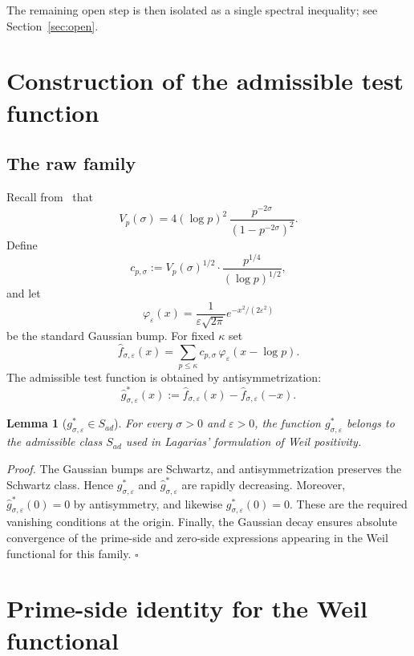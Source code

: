 \documentclass[11pt]{article}
\newtheorem*{lemma*}{Lemma}
\begin{document}
The remaining open step is then isolated as a single spectral inequality;
see Section~\ref{sec:open}.

\section{Construction of the admissible test function}

\subsection{The raw family}

Recall from~\cite[Eq.~(3)]{paper1} that
\[
V_p(\sigma)
= 4(\log p)^2\,\frac{p^{-2\sigma}}{(1-p^{-2\sigma})^2}.
\]
Define
\[
c_{p,\sigma}
:= V_p(\sigma)^{1/2}
\cdot \frac{p^{1/4}}{(\log p)^{1/2}},
\]
and let
\[
\varphi_\varepsilon(x)
= \frac{1}{\varepsilon\sqrt{2\pi}}e^{-x^2/(2\varepsilon^2)}
\]
be the standard Gaussian bump. For fixed $\kappa$ set
\[
\widehat f_{\sigma,\varepsilon}(x)
= \sum_{p\le\kappa} c_{p,\sigma}\,\varphi_\varepsilon(x-\log p).
\]
The admissible test function is obtained by antisymmetrization:
\begin{equation}\label{eq:gstar}
\widehat g^*_{\sigma,\varepsilon}(x)
:= \widehat f_{\sigma,\varepsilon}(x)
- \widehat f_{\sigma,\varepsilon}(-x).
\end{equation}

\begin{lemma*}[$g^*_{\sigma,\varepsilon} \in S_{ad}$]
For every $\sigma>0$ and $\varepsilon>0$, the function
$g^*_{\sigma,\varepsilon}$ belongs to the admissible class $S_{ad}$ used in
Lagarias' formulation of Weil positivity.
\end{lemma*}

\textit{Proof.}
The Gaussian bumps are Schwartz, and antisymmetrization preserves the
Schwartz class. Hence $g^*_{\sigma,\varepsilon}$ and
$\widehat g^*_{\sigma,\varepsilon}$ are rapidly decreasing. Moreover,
$\widehat g^*_{\sigma,\varepsilon}(0)=0$ by antisymmetry, and likewise
$g^*_{\sigma,\varepsilon}(0)=0$. These are the required vanishing conditions
at the origin. Finally, the Gaussian decay ensures absolute convergence of the
prime-side and zero-side expressions appearing in the Weil functional for this
family. \hfill$\square$

\section{Prime-side identity for the Weil functional}
\end{document}
